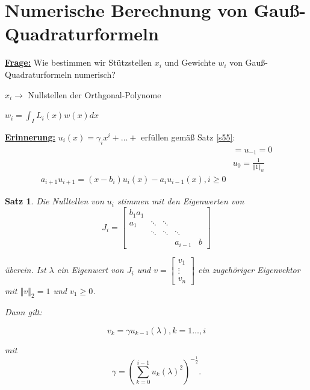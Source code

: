 \documentclass{book}
\newtheorem{theorem}[algorithm]{Satz}
\begin{document}
        \section{Numerische Berechnung von Gauß-Quadraturformeln}

            \underline{\textbf{Frage:}} Wie bestimmen wir Stützstellen $x_i$ und Gewichte $w_i$ von Gauß-Quadraturformeln numerisch?

            $x_i\to$ Nullstellen der Orthgonal-Polynome

            $w_i=\int_I L_i(x)w(x)dx$

            \underline{\textbf{Erinnerung:}} $u_i(x)=\gamma_ix^i+\dots+$ erfüllen gemäß Satz \ref{s55}:
            \begin{align*}
                &=u_{-1}=0\\
                &u_0=\frac{1}{\left\Vert 1 \right\Vert_w}\\
                a_{i+1}u_{i+1}=(x-b_i)u_i(x)-a_iu_{i-1}(x),i\geq 0
            \end{align*}

            \begin{theorem}\label{s514} %
                Die Nulltellen von $u_i$ stimmen mit den Eigenwerten von 
                \begin{equation*}
                    J_i=\begin{bmatrix}
                        b_1 a_1 & &&\\
                        a_1 & \ddots & \ddots & &\\
                        &\ddots & \ddots & \ddots & \\
                        &&&a_{i-1} & b
                    \end{bmatrix}
                \end{equation*}

                überein. Ist $\lambda$ ein Eigenwert von $J_i$ und $v=\begin{bmatrix}
                    v_1\\
                    \vdots\\
                    v_n
                \end{bmatrix}$ ein zugehöriger Eigenvektor mit $\left\Vert v \right\Vert_2=1$ und $v_1\geq 0$.

                Dann gilt: 

                \begin{equation*}
                    v_k=\gamma u_{k-1}(\lambda), k=1\dots,i
                \end{equation*}

                mit 
                \begin{equation*}
                    \gamma=\left(\sum_{k=0}^{i-1}u_k(\lambda)^2\right)^{-\frac{1}{2}}.
                \end{equation*}
            \end{theorem}
\end{document}
